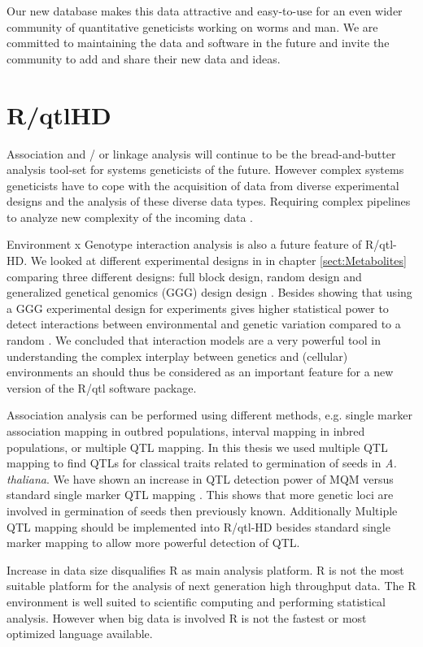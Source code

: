 Our new database makes this data attractive and easy-to-use for an even wider community of 
quantitative geneticists working on worms and man. We are committed to maintaining the data and 
software in the future and invite the community to add and share their new data and ideas. 

\section{R/qtlHD}
\label{sect:qtlHD}
Association and / or linkage analysis will continue to be the bread-and-butter analysis 
tool-set for systems geneticists of the future. However complex systems geneticists have 
to cope with the acquisition of data from diverse experimental designs and the analysis of 
these diverse data types. Requiring complex pipelines to analyze new complexity of the 
incoming data \cite{Trelles:2011}.

Environment x Genotype interaction analysis is also a future feature of R/qtl-HD. We looked at 
different experimental designs in in chapter \ref{sect:Metabolites} comparing three different 
designs: full block design, random design and generalized genetical genomics (GGG) design design 
\cite{Joosen:2013, Li:2009}. Besides showing that using a GGG experimental design for experiments 
gives higher statistical power to detect interactions between environmental and genetic variation 
compared to a random \cite{Joosen:2013}. We concluded that interaction models are a very powerful 
tool in understanding the complex interplay between genetics and (cellular) environments 
\cite{Joosen:2013} an should thus be considered as an important feature for a new version of the 
R/qtl software package.

Association analysis can be performed using different methods, e.g. single marker association 
mapping in outbred populations, interval mapping in inbred populations, or multiple QTL mapping. 
In this thesis we used multiple QTL mapping to find QTLs for classical traits related to 
germination of seeds in \emph{A. thaliana}. We have shown an increase in QTL detection power 
of MQM versus standard single marker QTL mapping \cite{Jansen:1994a, Joosen:2011}. This shows 
that more genetic loci are involved in germination of seeds then previously known. Additionally 
Multiple QTL mapping should be implemented into R/qtl-HD besides standard single marker mapping 
to allow more powerful detection of QTL.

Increase in data size disqualifies R as main analysis platform. R is not the most suitable 
platform for the analysis of next generation high throughput data. The R environment is 
well suited to scientific computing and performing statistical analysis. However when big data 
is involved R is not the fastest or most optimized language available. 

